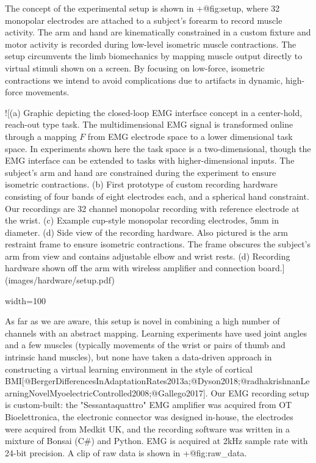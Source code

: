 \documentclass[../main.tex]{subfiles}
\begin{document}
The concept of the experimental setup is shown in {+@fig:setup}, where 32 monopolar electrodes are attached to a subject’s forearm to record muscle activity. The arm and hand are kinematically constrained in a custom fixture and motor activity is recorded during low-level isometric muscle contractions. The setup circumvents the limb biomechanics by mapping muscle output directly to virtual stimuli shown on a screen. By focusing on low-force, isometric contractions we intend to avoid complications due to artifacts in dynamic, high-force movements.

![(a) Graphic depicting the closed-loop EMG interface concept in a center-hold, reach-out type task. The multidimensional EMG signal is transformed online through a mapping $F$ from EMG electrode space to a lower dimensional task space. In experiments shown here the task space is a two-dimensional, though the EMG interface can be extended to tasks with higher-dimensional inputs. The subject's arm and hand are constrained during the experiment to ensure isometric contractions. (b) First prototype of custom recording hardware consisting of four bands of eight electrodes each, and a spherical hand constraint. Our recordings are 32 channel monopolar recording with reference electrode at the wrist. (c) Example cup-style monopolar recording electrodes, 5mm in diameter. (d) Side view of the recording hardware. Also pictured is the arm restraint frame to ensure isometric contractions. The frame obscures the subject's arm from view and contains adjustable elbow and wrist rests. (d) Recording hardware shown off the arm with wireless amplifier and connection board.](images/hardware/setup.pdf){width=100%

As far as we are aware, this setup is novel in combining a high number of channels with an abstract mapping. Learning experiments have used joint angles and a few muscles (typically movements of the wrist or pairs of thumb and intrinsic hand muscles), but none have taken a data-driven approach in constructing a virtual learning environment in the style of cortical BMI[@BergerDifferencesInAdaptationRates2013a;@Dyson2018;@radhakrishnanLearningNovelMyoelectricControlled2008;@Gallego2017]. Our EMG recording setup is custom-built: the "Sessantaquattro" EMG amplifier was acquired from OT Bioelettronica, the electronic connector was designed in-house, the electrodes were acquired from Medkit UK, and the recording software was written in a mixture of Bonsai (C#) and Python. EMG is acquired at 2kHz sample rate with 24-bit precision. A clip of raw data is shown in {+@fig:raw_data}.

}
\end{document}
